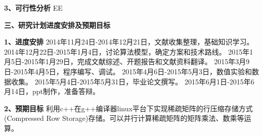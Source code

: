 \documentclass{article}
\begin{document}
     \textbf{3、可行性分析}
     EE
\newline

\textbf{三、研究计划进度安排及预期目标}
      \qquad
\newline
 

     \textbf{1、进度安排}\qquad \newline
     2014年11月24日-2014年12月21日，文献收集整理，基础知识学习。\newline
2014年12月22日-2015年1月4日，讨论算法模型，确定方案和技术路线。\newline
2015年1月5日-2015年1月29日，完成文献综述、开题报告和文献资料翻译。\newline
2015年3月9日-2015年4月5日，程序编写、调试。\newline
2015年4月6日-2015年5月3日，数值实验和数据收集。\newline
2015年5月4日-2015年5月31日，毕业论文撰写。\newline
2015年6月1日-2015年6月14日，ppt制作，准备答辩。
\newline



     \textbf{2、预期目标}
     利用c++在g++编译器linux平台下实现稀疏矩阵的行压缩存储方式(Compressed Row Storage)存储。可以并行计算稀疏矩阵的矩阵乘法、数乘等运算。
\newline
 
 
 
 
\end{document}
